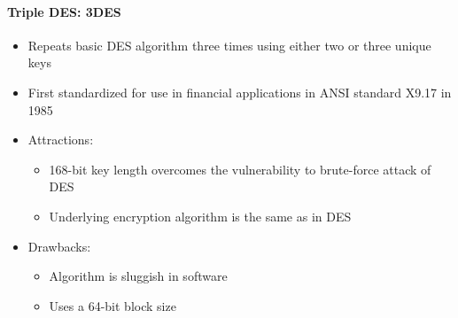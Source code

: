 \documentclass{article}
\begin{document}
                            \paragraph{Triple DES: 3DES}
                                        \begin{itemize}
                                            \item Repeats basic DES algorithm three times using either two or three unique keys
                                            \item First standardized for use in financial applications in ANSI standard X9.17 in 1985
                                            \item Attractions:
                                            \begin{itemize}
                                                \item 168-bit key length overcomes the vulnerability to brute-force attack of DES
                                                \item Underlying encryption algorithm is the same as in DES
                                            \end{itemize}
                                            \item Drawbacks:
                                            \begin{itemize}
                                                \item Algorithm is sluggish in software
                                                \item Uses a 64-bit block size
                                            \end{itemize}
                                        \end{itemize}
\end{document}
